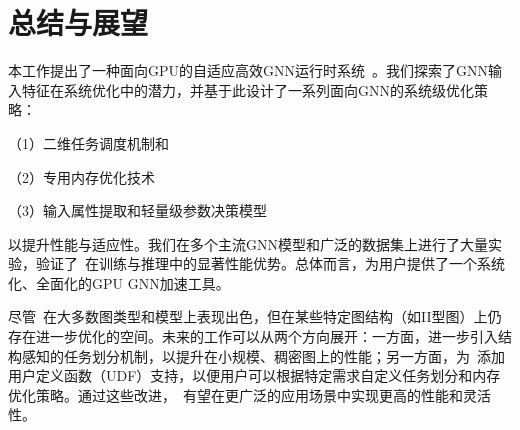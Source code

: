 \section{总结与展望}
本工作提出了一种面向GPU的自适应高效GNN运行时系统~\Mname。我们探索了GNN输入特征在系统优化中的潜力，并基于此设计了一系列面向GNN的系统级优化策略：

（1）二维任务调度机制和

（2）专用内存优化技术

（3）输入属性提取和轻量级参数决策模型

\noindent 以提升性能与适应性。我们在多个主流GNN模型和广泛的数据集上进行了大量实验，验证了~\Mname{}在训练与推理中的显著性能优势。总体而言，\Mname{}为用户提供了一个系统化、全面化的GPU GNN加速工具。

尽管~\Mname{}在大多数图类型和模型上表现出色，但在某些特定图结构（如II型图）上仍存在进一步优化的空间。未来的工作可以从两个方向展开：一方面，进一步引入结构感知的任务划分机制，以提升在小规模、稠密图上的性能；另一方面，为~\Mname{}添加用户定义函数（UDF）支持，以便用户可以根据特定需求自定义任务划分和内存优化策略。通过这些改进，~\Mname{}有望在更广泛的应用场景中实现更高的性能和灵活性。